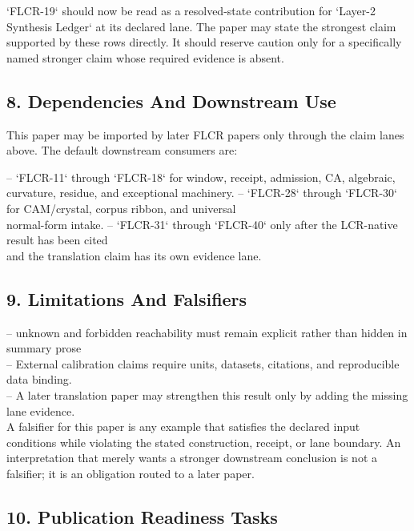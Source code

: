 \documentclass[11pt]{article}
\begin{document}
`FLCR-19` should now be read as a resolved-state contribution for `Layer-2 Synthesis Ledger` at its declared lane. The paper may state the strongest claim supported by these rows directly. It should reserve caution only for a specifically named stronger claim whose required evidence is absent.

\subsection*{8. Dependencies And Downstream Use}

This paper may be imported by later FLCR papers only through the claim lanes
above. The default downstream consumers are:

\noindent{}-- `FLCR-11` through `FLCR-18` for window, receipt, admission, CA, algebraic,\\
  curvature, residue, and exceptional machinery.
\noindent{}-- `FLCR-28` through `FLCR-30` for CAM/crystal, corpus ribbon, and universal\\
  normal-form intake.
\noindent{}-- `FLCR-31` through `FLCR-40` only after the LCR-native result has been cited\\
  and the translation claim has its own evidence lane.

\subsection*{9. Limitations And Falsifiers}

\noindent{}-- unknown and forbidden reachability must remain explicit rather than hidden in summary prose\\
\noindent{}-- External calibration claims require units, datasets, citations, and reproducible data binding.\\
\noindent{}-- A later translation paper may strengthen this result only by adding the missing lane evidence.\\

A falsifier for this paper is any example that satisfies the declared input
conditions while violating the stated construction, receipt, or lane boundary.
An interpretation that merely wants a stronger downstream conclusion is not a
falsifier; it is an obligation routed to a later paper.

\subsection*{10. Publication Readiness Tasks}
\end{document}
